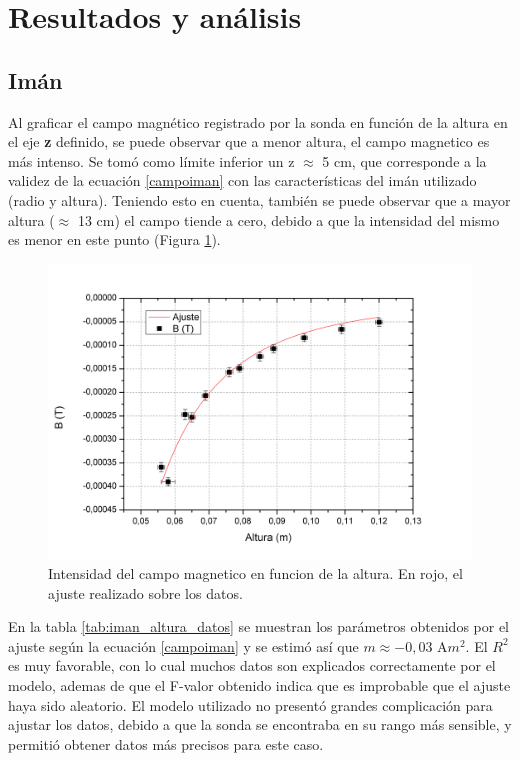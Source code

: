 \documentclass[12pt]{article}
\begin{document}
\section{Resultados y an\'alisis}

\subsection{Im\'an}

Al graficar el campo magn\'etico registrado por la sonda en funci\'on de la altura en el eje \textbf{z} definido, se puede observar que a menor altura, el campo magnetico es más intenso. Se tomó como límite inferior un z $\approx$ 5 cm, que corresponde a la validez de la ecuación \ref{campoiman} con las características del imán utilizado (radio y altura). Teniendo esto en cuenta, también se puede observar que a mayor altura ($\approx$ 13 cm) el campo tiende a cero, debido a que la intensidad del mismo es menor en este punto (Figura \ref{fig:iman_altura_ajuste.jpg}).\\



\begin{figure}[H]
\includegraphics[width=\linewidth]{iman_altura_ajuste.jpg}
\caption{Intensidad del campo magnetico en funcion de la altura. En rojo, el ajuste realizado sobre los datos.}
\label{fig:iman_altura_ajuste.jpg}
\end{figure}

En la tabla \ref{tab:iman_altura_datos} se muestran los par\'ametros obtenidos por el ajuste seg\'un la ecuaci\'on \ref{campoiman} y se estim\'o as\'i que $m\approx -0,03$ A$m^{2}$. El $R^2$ es muy favorable, con lo cual muchos datos son explicados correctamente por el modelo, ademas de que el F-valor obtenido indica que es improbable que el ajuste haya sido aleatorio. El modelo utilizado no present\'o grandes complicaci\'on para ajustar los datos, debido a que la sonda se encontraba en su rango m\'as sensible, y permiti\'o obtener datos m\'as precisos para este caso. \\ 
\end{document}
